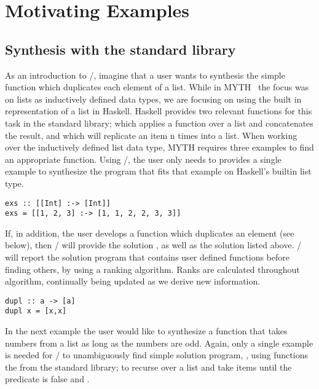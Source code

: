 \section{Motivating Examples} 
\label{examples}

\subsection{Synthesis with the standard library}

As an introduction to \ourTool/, imagine that a user wants to synthesis the simple  \cite{Osera:2015} function which duplicates each element of a list.
While in MYTH~\cite{Osera:2015} the focus was on lists as inductively defined data types, we are focusing on using the built in representation of a list in Haskell.
Haskell provides two relevant functions for this task in the standard library;  which applies a function over a list and concatenates the result, and  which will replicate an item n times into a list.
When working over the inductively defined list data type, MYTH requires three examples to find an appropriate function. Using \ourTool/, the user only needs to provides a single example to synthesize the program  that fits that example on Haskell's builtin list type.

\begin{lstlisting}
exs :: [[Int] :-> [Int]]
exs = [[1, 2, 3] :-> [1, 1, 2, 2, 3, 3]]
\end{lstlisting}

If, in addition, the user develops a function  which duplicates an element (see below), then \ourTool/ will provide the solution , as well as the solution listed above. \ourTool/ will report the solution program that contains user defined functions before finding others, by using a ranking algorithm. Ranks are calculated throughout algorithm, continually being updated as we derive new information.

\begin{lstlisting}
dupl :: a -> [a]
dupl x = [x,x]
\end{lstlisting}

In the next example the user would like to synthesize a function that takes numbers from a list as long as the numbers are odd.
Again, only a single example is needed for \ourTool/ to unambiguously find  simple solution program, , using functions the from the standard library;  to recurse over a list and take items until the predicate is false and . 

